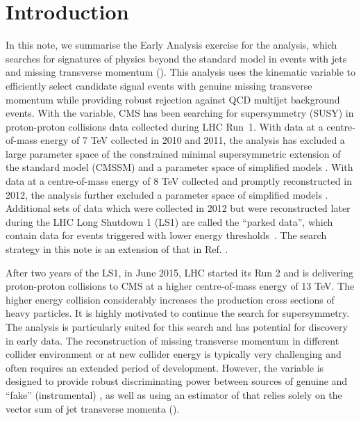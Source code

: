 \section{Introduction}
\label{sec:intro}

In this note, we summarise the Early Analysis exercise for the \alphat
analysis, which searches for signatures of physics beyond the standard
model in events with jets and missing transverse momentum (\met). This
analysis uses the kinematic variable \alphat to efficiently select
candidate signal events with genuine missing transverse momentum while
providing robust rejection against QCD multijet background
events. With the \alphat variable, CMS has been searching for
supersymmetry (SUSY) in proton-proton collisions data collected during
LHC Run~1. With data at a centre-of-mass energy of 7 TeV collected in
2010 and 2011, the \alphat analysis has excluded a large parameter
space of the constrained minimal supersymmetric extension of the
standard model (CMSSM) \cite{Khachatryan:2011tk, Chatrchyan:2011zy,
  Chatrchyan:2012wa} and a parameter space of simplified models
\cite{Chatrchyan:2012wa}. With data at a centre-of-mass energy of 8
TeV collected and promptly reconstructed in 2012, the \alphat analysis
further excluded a parameter space of simplified models
\cite{Chatrchyan:2013lya}. Additional sets of data which were
collected in 2012 but were reconstructed later during the LHC Long
Shutdown 1 (LS1) are called the ``parked data'', which contain data
for events triggered with lower energy
thresholds~\cite{CMS_AN_2013-366}.
The search strategy in this note is an extension of that in Ref.
\cite{CMS_AN_2013-366}.

After two years of the LS1, in June 2015, LHC started its Run 2 and is
delivering proton-proton collisions to CMS at a higher centre-of-mass
energy of 13 TeV. The higher energy collision considerably increases
the production cross sections of heavy particles. It is highly
motivated to continue the search for supersymmetry. The \alphat
analysis is particularly suited for this search and has potential for
discovery in early data. The reconstruction of missing transverse
momentum in different collider environment or at new collider energy
is typically very challenging and often requires an extended period of
development. However, the \alphat variable is designed to provide
robust discriminating power between sources of genuine and ``fake''
(\eg instrumental) \met, as well as using an estimator of \met that
relies solely on the vector sum of jet transverse momenta (\mht).


